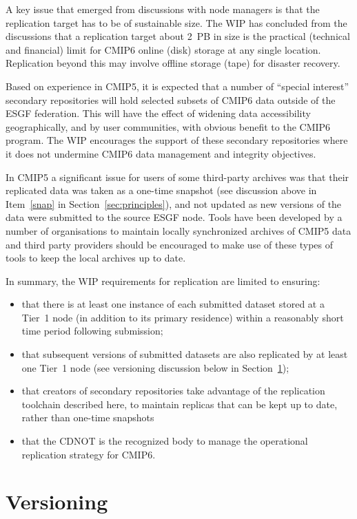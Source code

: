 \documentclass[gmd,manuscript]{copernicus}
\begin{document}
A key issue that emerged from discussions with node managers is that
the replication target has to be of sustainable size. The WIP has
concluded from the discussions that a replication target about 2~PB in
size is the practical (technical and financial) limit for CMIP6 online
(disk) storage at any single location. Replication beyond this may
involve offline storage (tape) for disaster recovery.

Based on experience in CMIP5, it is expected that a number of
``special interest'' secondary repositories will hold selected subsets
of CMIP6 data outside of the ESGF federation. This will have the
effect of widening data accessibility geographically, and by user
communities, with obvious benefit to the CMIP6 program. The WIP
encourages the support of these secondary repositories where it
does not undermine CMIP6 data management and integrity objectives.

In CMIP5 a significant issue for users of some third-party archives
was that their replicated data was taken as a one-time snapshot (see
discussion above in Item~\ref{snap} in Section~\ref{sec:principles}), and not
updated as new versions of the data were submitted to the source ESGF
node. Tools have been developed by a number of organisations to
maintain locally synchronized archives of CMIP5 data and third party
providers should be encouraged to make use of these types of tools to
keep the local archives up to date.

In summary, the WIP requirements for replication are limited to
ensuring:

\begin{itemize}
\item that there is at least one instance of each submitted dataset
  stored at a Tier~1 node (in addition to its primary residence)
  within a reasonably short time period following submission;
\item that subsequent versions of submitted datasets are also
  replicated by at least one Tier~1 node (see versioning discussion
  below in Section~\ref{sec:version});
\item that creators of secondary repositories take advantage of the
  replication toolchain described here, to maintain replicas that can
  be kept up to date, rather than one-time snapshots
\item that the CDNOT is the recognized body to manage the operational
  replication strategy for CMIP6.
\end{itemize}

\section{Versioning}
\label{sec:version}
\end{document}
